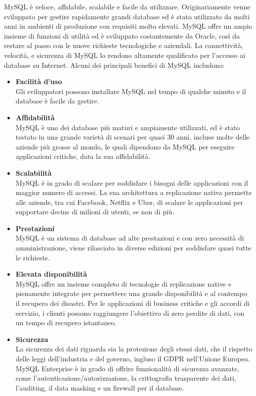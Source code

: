 MySQL è veloce, affidabile, scalabile e facile da utilizzare. Originariamente venne sviluppato per gestire rapidamente grandi database ed è stato utilizzato da molti anni in ambienti di produzione con requisiti molto elevati. MySQL offre un ampio insieme di funzioni di utilità ed è sviluppato costantemente da Oracle, così da restare al passo con le nuove richieste tecnologiche e aziendali. La connettività, velocità, e sicurezza di MySQL lo rendono altamente qualificato per l'accesso ai database su Internet. Alcuni dei principali benefici di MySQL includono:
\begin{itemize}
    \item \textbf{Facilità d'uso}\\
    Gli sviluppatori possono installare MySQL nel tempo di qualche minuto e il database è facile da gestire.
    \item \textbf{Affidabilità}\\
    MySQL è uno dei database più maturi e ampiamente utilizzati, ed è stato testato in una grande varietà di scenari per quasi 30 anni, incluse molte delle aziende più grosse al mondo, le quali dipendono da MySQL per eseguire applicazioni critiche, data la sua affidabilità.
    \item \textbf{Scalabilità}\\
    MySQL è in grado di scalare per soddisfare i bisogni delle applicazioni con il maggior numero di accessi. La sua architettura a replicazione nativa permette alle aziende, tra cui Facebook, Netflix e Uber, di scalare le applicazioni per supportare decine di milioni di utenti, se non di più.
    \item \textbf{Prestazioni}\\
    MySQL è un sistema di database ad alte prestazioni e con zero necessità di amministrazione, viene rilasciato in diverse edizioni per soddisfare quasi tutte le richieste.
    \item \textbf{Elevata disponibilità}\\
    MySQL offre un insieme completo di tecnologie di replicazione native e pienamente integrate per permettere una grande disponibilità e al contempo il recupero dei disastri. Per le applicazioni di business critiche e gli accordi di servizio, i clienti possono raggiungere l'obiettivo di zero perdite di dati, con un tempo di recupero istantaneo.
    \item \textbf{Sicurezza}\\
    La sicurezza dei dati riguarda sia la protezione degli stessi dati, che il rispetto delle leggi dell'industria e del governo, ingluso il GDPR nell'Unione Europea. MySQL Enterprise è in grado di offrire funzionalità di sicurezza avanzate, come l'autenticazione/autorizzazione, la crittografia trasparente dei dati, l'auditing, il data masking e un firewall per il database.

\end{itemize}
